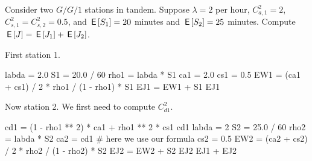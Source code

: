 \documentclass[stochastic-or.tex]{subfiles}
\begin{document}
\begin{exercise}\label{ex:l-127}
Consider two $G/G/1$ stations in tandem.
Suppose $\lambda=2$ per hour, $C_{a,1}^2=2$, $C_{s,1}^2=C_{s,2}^2 = 0.5$, and $\,\mathsf{E}\left[S_1\right]=20$ minutes and $\,\mathsf{E}\left[S_2\right]=25$ minutes.
Compute $\,\mathsf{E}\left[J\right] = \,\mathsf{E}\left[J_1\right]+ \,\mathsf{E}\left[J_2\right]$.
\begin{solution}
First station 1.
\begin{pyconsole}
labda = 2.0
S1 = 20.0 / 60
rho1 = labda * S1
ca1 = 2.0
cs1 = 0.5
EW1 = (ca1 + cs1) / 2 * rho1 / (1 - rho1) * S1
EJ1 = EW1 + S1
EJ1
\end{pyconsole}

Now station 2. We first need to compute $C_{d1}^2$.

\begin{pyconsole}
cd1 = (1 - rho1 ** 2) * ca1 + rho1 ** 2 * cs1
cd1
labda = 2
S2 = 25.0 / 60
rho2 = labda * S2
ca2 = cd1  # here we use our formula
cs2 = 0.5
EW2 = (ca2 + cs2) / 2 * rho2 / (1 - rho2) * S2
EJ2 = EW2 + S2
EJ2
EJ1 + EJ2
\end{pyconsole}

\end{solution}
\end{exercise}



\end{document}
